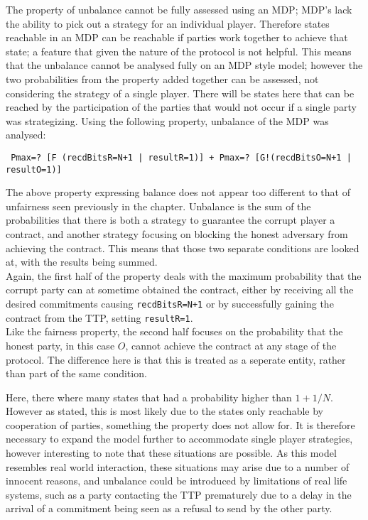 \documentclass{l4proj}
\begin{document}
The property of unbalance cannot be fully assessed using an MDP; MDP's lack the ability to pick out a strategy for an individual player. Therefore states reachable in an MDP can be reachable if parties work together to achieve that state; a feature that given the nature of the protocol is not helpful. This means that the unbalance cannot be analysed fully on an MDP style model; however the two probabilities from the property added together can be assessed, not considering the strategy of a single player. There will be states here that can be reached by the participation of the parties that would not occur if a single party was strategizing. Using the following property, unbalance of the MDP was analysed:
\begin{lstlisting}
 Pmax=? [F (recdBitsR=N+1 | resultR=1)] + Pmax=? [G!(recdBitsO=N+1 | resultO=1)]
\end{lstlisting}

The above property expressing balance does not appear too different to that of unfairness seen previously in the chapter. Unbalance is the sum of the probabilities that there is both a strategy to guarantee the corrupt player a contract, and another strategy focusing on blocking the honest adversary from achieving the contract. This means that those two separate conditions are looked at, with the results being summed. \\
Again, the first half of the property deals with the maximum probability that the corrupt party can at sometime obtained the contract, either by receiving all the desired commitments causing {\tt recdBitsR=N+1} or by successfully gaining the contract from the TTP, setting {\tt resultR=1}.\\
Like the fairness property, the second half focuses on the probability that the honest party, in this case $O$, cannot achieve the contract at any stage of the protocol. The difference here is that this is treated as a seperate entity, rather than part of the same condition.


Here, there where many states that had a probability higher than $1+1/N$. However as stated, this is most likely due to the states only reachable by cooperation of parties, something the property does not allow for. It is therefore necessary to expand the model further to accommodate single player strategies, however interesting to note that these situations are possible. As this model resembles real world interaction, these situations may arise due to a number of innocent reasons, and unbalance could be introduced by limitations of real life systems, such as a party contacting the TTP prematurely due to a delay in the arrival of a commitment being seen as a refusal to send by the other party.
\end{document}
